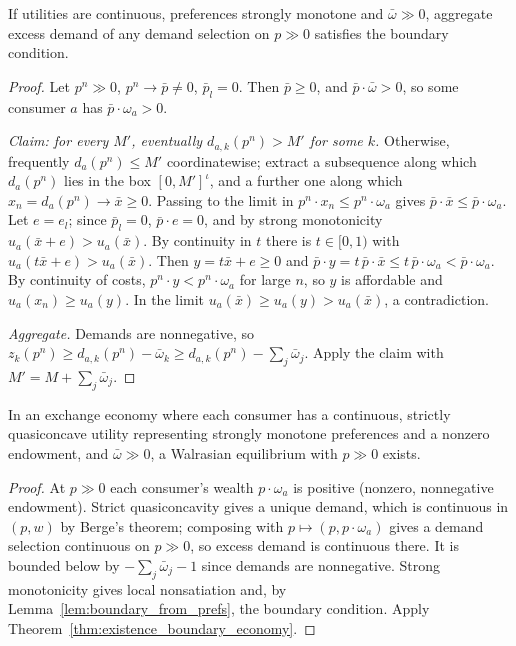 \begin{lemma}
\label{lem:boundary_from_prefs}
\leanok
{}
If utilities are continuous, preferences strongly monotone and $\bar\omega \gg 0$, aggregate excess demand of any demand
selection on $p \gg 0$ satisfies the boundary condition.
\end{lemma}
\begin{proof}
\leanok
Let $p^n \gg 0$, $p^n \to \bar p \ne 0$, $\bar p_l = 0$. Then $\bar p \ge 0$, and $\bar p \cdot \bar\omega > 0$, so some consumer
$a$ has $\bar p \cdot \omega_a > 0$.

\emph{Claim: for every $M'$, eventually $d_{a,k}(p^n) > M'$ for some $k$.} Otherwise, frequently $d_a(p^n) \le M'$
coordinatewise; extract a subsequence along which $d_a(p^n)$ lies in the box $[0, M']^\iota$, and a further one along which
$x_n = d_a(p^n) \to \bar x \ge 0$. Passing to the limit in $p^n \cdot x_n \le p^n \cdot \omega_a$ gives
$\bar p \cdot \bar x \le \bar p \cdot \omega_a$. Let $e = e_l$; since $\bar p_l = 0$, $\bar p \cdot e = 0$, and by strong monotonicity
$u_a(\bar x + e) > u_a(\bar x)$. By continuity in $t$ there is $t \in [0, 1)$ with $u_a(t\bar x + e) > u_a(\bar x)$. Then
$y = t\bar x + e \ge 0$ and $\bar p \cdot y = t\, \bar p \cdot \bar x \le t\, \bar p \cdot \omega_a < \bar p \cdot \omega_a$. By continuity
of costs, $p^n \cdot y < p^n \cdot \omega_a$ for large $n$, so $y$ is affordable and $u_a(x_n) \ge u_a(y)$. In the limit
$u_a(\bar x) \ge u_a(y) > u_a(\bar x)$, a contradiction.

\emph{Aggregate.} Demands are nonnegative, so $z_k(p^n) \ge d_{a,k}(p^n) - \bar\omega_k \ge d_{a,k}(p^n) - \sum_j \bar\omega_j$.
Apply the claim with $M' = M + \sum_j \bar\omega_j$.
\end{proof}

\begin{theorem}
\label{thm:existence_preferences}
\leanok
{}
In an exchange economy where each consumer has a continuous, strictly quasiconcave utility representing strongly
monotone preferences and a nonzero endowment, and $\bar\omega \gg 0$, a Walrasian equilibrium with $p \gg 0$ exists.
\end{theorem}
\begin{proof}
\leanok
At $p \gg 0$ each consumer's wealth $p \cdot \omega_a$ is positive (nonzero, nonnegative endowment). Strict quasiconcavity
gives a unique demand, which is continuous in $(p, w)$ by Berge's theorem; composing with $p \mapsto (p, p \cdot \omega_a)$
gives a demand selection continuous on $p \gg 0$, so excess demand is continuous there. It is bounded below by
$-\sum_j \bar\omega_j - 1$ since demands are nonnegative. Strong monotonicity gives local nonsatiation and, by
Lemma~\ref{lem:boundary_from_prefs}, the boundary condition. Apply Theorem~\ref{thm:existence_boundary_economy}.
\end{proof}

